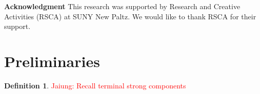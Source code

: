 \documentclass[11pt,reqno]{amsart}
\DeclareMathOperator{\Pic}{Pic}
\DeclareMathOperator{\Jac}{Jac}
\newcommand{\youngsu}[1]{{\textcolor{blue}{Youngsu: #1}}}
\theoremstyle{definition}
\newtheorem{mydef}{Definition}[section]
\theoremstyle{plain}
\begin{document}




\bigskip


\textbf{Acknowledgment}\hspace{0.1cm} This research was supported by Research and Creative Activities (RSCA) at SUNY New Paltz. We would like to thank RSCA for their support.

\section{Preliminaries}

\begin{mydef}
	\textcolor{red}{Jaiung: Recall terminal strong components}
\end{mydef}
\end{document}

